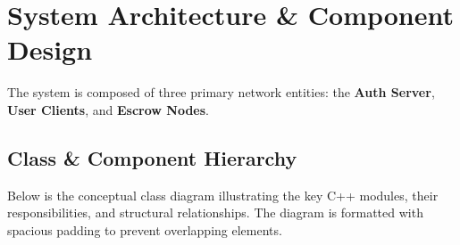 \documentclass[11pt,a4paper]{article}
\begin{document}
\section{System Architecture \& Component Design}
\label{sec:architecture}

The system is composed of three primary network entities: the \textbf{Auth Server}, \textbf{User Clients}, and \textbf{Escrow Nodes}.

\subsection{Class \& Component Hierarchy}

Below is the conceptual class diagram illustrating the key C++ modules, their responsibilities, and structural relationships. The diagram is formatted with spacious padding to prevent overlapping elements.
\end{document}
